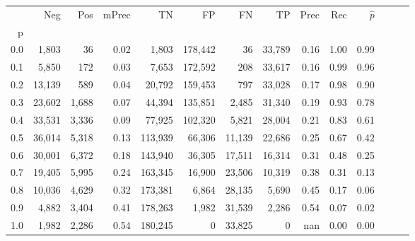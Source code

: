 \begin{tabular}{rrrrrrrrrrrrrr}
\toprule
{} &     Neg &    Pos & mPrec &       TN &       FP &      FN &      TP &  Prec &   Rec & $\hat{p}$ \\
p   &         &        &       &          &          &         &         &       &       &           \\
\midrule
0.0 &   1,803 &     36 &  0.02 &    1,803 &  178,442 &      36 &  33,789 &  0.16 &  1.00 &      0.99 \\
0.1 &   5,850 &    172 &  0.03 &    7,653 &  172,592 &     208 &  33,617 &  0.16 &  0.99 &      0.96 \\
0.2 &  13,139 &    589 &  0.04 &   20,792 &  159,453 &     797 &  33,028 &  0.17 &  0.98 &      0.90 \\
0.3 &  23,602 &  1,688 &  0.07 &   44,394 &  135,851 &   2,485 &  31,340 &  0.19 &  0.93 &      0.78 \\
0.4 &  33,531 &  3,336 &  0.09 &   77,925 &  102,320 &   5,821 &  28,004 &  0.21 &  0.83 &      0.61 \\
0.5 &  36,014 &  5,318 &  0.13 &  113,939 &   66,306 &  11,139 &  22,686 &  0.25 &  0.67 &      0.42 \\
0.6 &  30,001 &  6,372 &  0.18 &  143,940 &   36,305 &  17,511 &  16,314 &  0.31 &  0.48 &      0.25 \\
0.7 &  19,405 &  5,995 &  0.24 &  163,345 &   16,900 &  23,506 &  10,319 &  0.38 &  0.31 &      0.13 \\
0.8 &  10,036 &  4,629 &  0.32 &  173,381 &    6,864 &  28,135 &   5,690 &  0.45 &  0.17 &      0.06 \\
0.9 &   4,882 &  3,404 &  0.41 &  178,263 &    1,982 &  31,539 &   2,286 &  0.54 &  0.07 &      0.02 \\
1.0 &   1,982 &  2,286 &  0.54 &  180,245 &        0 &  33,825 &       0 &   nan &  0.00 &      0.00 \\
\bottomrule
\end{tabular}
